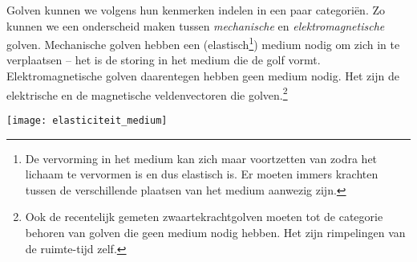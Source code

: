 \documentclass{ximera}
\begin{document}
	\author{Bart Lambregs}
    \xmsource

	
	Golven kunnen we volgens hun kenmerken indelen in een paar categoriën. Zo kunnen we een onderscheid maken tussen \emph{mechanische} en \emph{elektromagnetische} golven. Mechanische golven hebben een (elastisch\footnote{De vervorming in het medium kan zich maar voortzetten van zodra het lichaam te vervormen is en dus elastisch is. Er moeten immers krachten tussen de verschillende plaatsen van het medium aanwezig zijn.}) medium nodig om zich in te verplaatsen -- het is de storing in het medium die de golf vormt. Elektromagnetische golven daarentegen hebben geen medium nodig. Het zijn de elektrische en de magnetische veldenvectoren die golven.\footnote{Ook de recentelijk gemeten zwaartekrachtgolven moeten tot de categorie behoren van golven die geen medium nodig hebben. Het zijn rimpelingen van de ruimte-tijd zelf.}
	\begin{image}
	
	\texttt{[image: elasticiteit\_medium]}
	\end{image}
	
\end{document}
